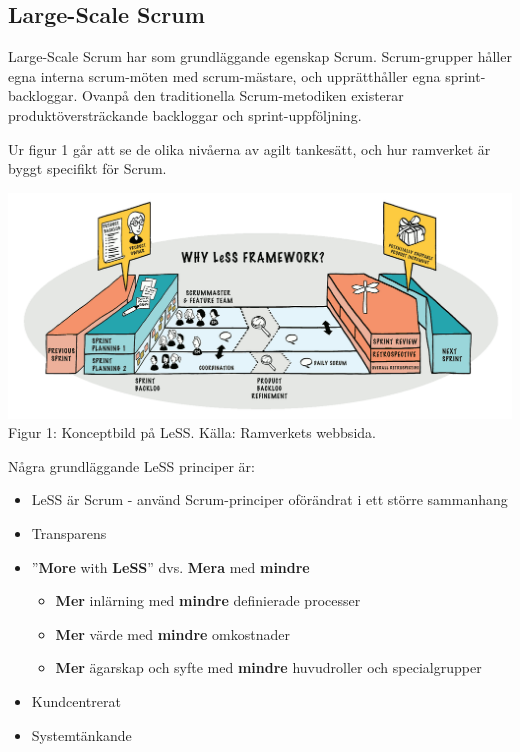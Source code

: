 	
	\subsection{Large-Scale Scrum}
	
	
		Large-Scale Scrum har som grundläggande egenskap Scrum. Scrum-grupper håller egna interna scrum-möten med scrum-mästare, och upprätthåller egna sprint-backloggar. Ovanpå den traditionella Scrum-metodiken existerar produktöversträckande backloggar och sprint-uppföljning.
		
		Ur figur 1 går att se de olika nivåerna av agilt tankesätt, och hur ramverket är byggt specifikt för Scrum. \cite{less_overview}
		
		\begin{center}	
			\includegraphics{Material/less_framework.png}
		\\ Figur 1: Konceptbild på LeSS. Källa: Ramverkets webbsida. \cite{less_web}
		\end{center}
	
		Några grundläggande LeSS principer är: \cite{less_principles}
	
		\begin{itemize}
			\setlength{\itemsep}{1pt}
			\item LeSS är Scrum - använd Scrum-principer oförändrat i ett större sammanhang			
			\item Transparens
			\item ''\textbf{More} with \textbf{LeSS}'' dvs. \textbf{Mera} med \textbf{mindre}
				\begin{itemize}
					\item \textbf{Mer} inlärning med \textbf{mindre} definierade processer
					\item \textbf{Mer} värde med \textbf{mindre} omkostnader
					\item \textbf{Mer} ägarskap och syfte med \textbf{mindre} huvudroller och specialgrupper
				\end{itemize}
			\item Kundcentrerat
			\item Systemtänkande
		\end{itemize}
			
